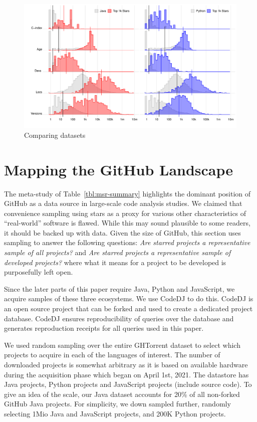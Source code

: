 \documentclass[sigconf,review,anonymous]{acmart}
\newcommand{\gh}{{GitHub}\xspace}
\newcommand{\ght}{{GHTorrent}\xspace}
\renewcommand{\dj}{{\textsf{Code{\small{DJ}}}}\xspace}
\begin{document}
\begin{figure}[!t]
    \includegraphics[width=.9\textwidth]{../figs/lang_stars_attributes}
    \caption{Comparing datasets}\label{dataset}
\end{figure}

\section{Mapping the \gh Landscape}

The meta-study of Table~\ref{tbl:msr-summary} highlights the dominant position
of \gh as a data source in large-scale code analysis studies. We claimed that
convenience sampling using stars as a proxy for various other characteristics of
``real-world'' software is flawed. While this may sound plausible to some
readers, it should be backed up with data. Given the size of \gh, this section
uses sampling to answer the following questions: {\it Are starred projects a
  representative sample of all projects?} and {\it Are starred projects a
  representative sample of developed projects?} where what it means for a
project to be developed is purposefully left open.

Since the later parts of this paper require Java, Python and JavaScript, we
acquire samples of these three ecosystems. We use \dj to do this. \dj is an open
source project that can be forked and used to create a dedicated project
database. \dj ensures reproducibility of queries over the database and generates
reproduction receipts for all queries used in this paper.

We used random sampling over the entire \ght dataset to select which
projects to acquire in each of the languages of interest. The number of
downloaded projects is somewhat arbitrary as it is based on available hardware
during the acquisition phase which began on April 1st, 2021. The datastore has
\javaActualProjects Java projects, \pythonActualProjects Python projects and
\jsActualProjects JavaScript projects (include source code). To give an idea of
the scale, our Java dataset accounts for 20\% of all non-forked \gh Java
projects. For simplicity, we down sampled further, randomly selecting 1Mio Java
and JavaScript projects, and 200K Python projects.
\end{document}
